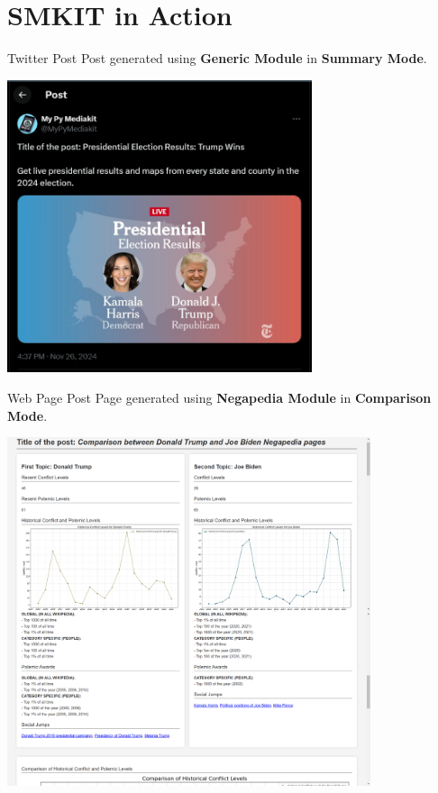 \documentclass{beamer}
\begin{document}
\section{SMKIT in Action}
    \begin{frame}{Twitter Post}
        Post generated using \textbf{Generic Module} in \textbf{Summary Mode}.
        \begin{center}
            \includegraphics[width=0.67\textwidth, keepaspectratio]{images/twitter_generic_summary_post_screenshot.png}
        \end{center}
    \end{frame}

    \begin{frame}{Web Page Post}
        Page generated using \textbf{Negapedia Module} in \textbf{Comparison Mode}.
        \begin{center}
            \includegraphics[width=0.8\textwidth, keepaspectratio]{images/web_page_negapedia_comparison_post_screenshot.png}
        \end{center}
    \end{frame}
    
\end{document}
